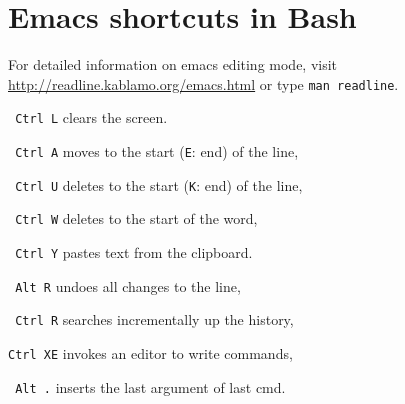 \section{Emacs shortcuts in Bash}
For detailed information on emacs editing mode, visit {\small\url{http://readline.kablamo.org/emacs.html}} or type \texttt{man readline}.

\begin{compactenum}
\item [\texttt{ Ctrl L}] clears the screen.
\item [\texttt{ Ctrl A}] moves to the start (\texttt{E}: end) of the line,
\item [\texttt{ Ctrl U}] deletes to the start (\texttt{K}: end) of the line,
\item [\texttt{ Ctrl W}] deletes to the start of the word,
\item [\texttt{ Ctrl Y}] pastes text from the clipboard.
\item [\texttt{ {} Alt R}] undoes all changes to the line,
\item [\texttt{ Ctrl R}] searches incrementally up the history,
\item [\texttt{Ctrl XE}] invokes an editor to write commands,
\item [\texttt{ {} Alt .}] inserts the last argument of last cmd.
\end{compactenum}